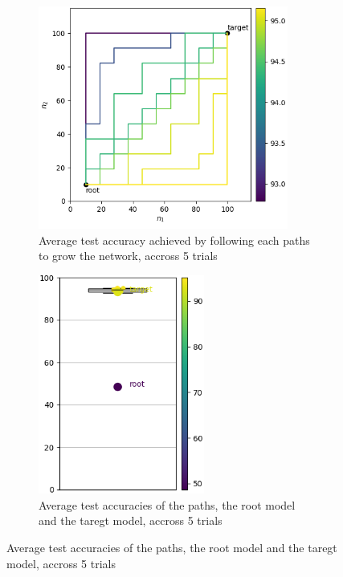 \documentclass{article}
\begin{document}
\begin{figure}[htbp]
    \centering
    \begin{subfigure}[b]{0.29\textwidth}
        \centering
        \includegraphics[width=0.9\textwidth]{imgs/pathes_MNIST_gradmax_2024_05_02_15_03_12.png}
        \caption{Average test accuracy achieved by following each paths to grow the network, accross 5 trials}
        \label{fig:MNIST_gradmax_pathes}
    \end{subfigure}
    \begin{subfigure}[b]{0.29\textwidth}
        \centering
        \includegraphics[width=0.6\textwidth]{imgs/box_plot_MNIST_gradmax_2024_05_02_15_03_13.png}
        \caption{Average test accuracies of the paths, the root model and the taregt model, accross 5 trials}
        \label{fig:MNIST_gradmax_box_plot}
    \end{subfigure}
    

\end{figure}
\end{document}
